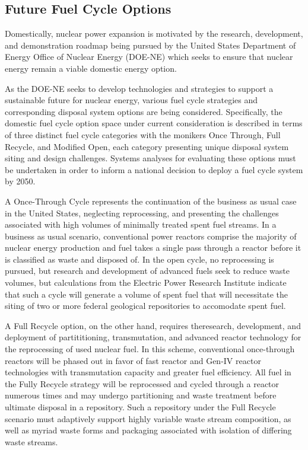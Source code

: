 \subsection{Future Fuel Cycle Options}

Domestically, nuclear power expansion is motivated by the research, 
development, and demonstration roadmap being pursued by the United 
States Department of Energy Office of Nuclear Energy (DOE-NE) which 
seeks to ensure that nuclear energy remain a viable domestic energy 
option.  \cite{DOE-NE_roadmap} 

As the DOE-NE seeks to develop technologies and strategies to support 
a sustainable future for nuclear energy, various fuel cycle strategies 
and corresponding disposal system options are being considered. 
Specifically, the domestic fuel cycle option space under current 
consideration is described in terms of three distinct fuel cycle 
categories with the monikers Once Through, Full Recycle, and Modified 
Open, each category presenting unique disposal system siting and 
design challenges. Systems analyses for evaluating these options must 
be undertaken in order to inform a national decision to deploy a fuel 
cycle system by 2050. \cite{DOE-NE_roadmap} 

A Once-Through Cycle represents the continuation of the business as 
usual case in the United States,  neglecting reprocessing, and 
presenting the challenges associated with high volumes of minimally 
treated spent fuel streams.  In a business as usual scenario, 
conventional power reactors comprise the majority of nuclear energy 
production and fuel takes a single pass through a reactor before it is 
classified as waste and disposed of. In the open cycle, no 
reprocessing is pursued, but research and development of advanced 
fuels seek to reduce waste volumes, but calculations from the Electric 
Power Research Institute indicate that such a cycle will generate a 
volume of spent fuel that will necessitate the siting of two or more 
federal  geological repositories to accomodate spent fuel.  
\cite{Room_at_the_mountain} 

A Full Recycle option, on the other hand, requires theresearch, 
development, and deployment of partititioning, transmutation, and 
advanced reactor technology for the reprocessing of used nuclear fuel.  
In this scheme, conventional once-through reactors will be phased out 
in favor of fast reactor and Gen-IV reactor technologies with 
transmutation capacity and greater fuel efficiency. All fuel in the 
Fully Recycle strategy will be reprocessed and cycled through a 
reactor numerous times and may undergo partitioning and waste 
treatment before ultimate disposal in a repository. Such a repository 
under the Full Recycle scenario must adaptively support highly 
variable waste stream composition, as well as myriad waste forms and 
packaging associated with isolation of differing waste streams.

